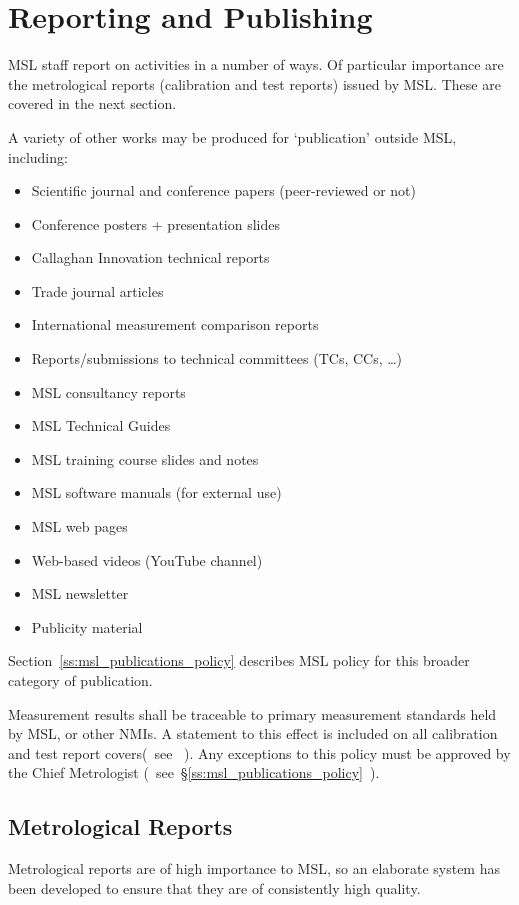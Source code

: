 \section{Reporting and Publishing}
MSL staff report on activities in a number of ways. Of particular importance are the metrological reports (calibration and test reports) issued by MSL. These are covered in the next section. 

A variety of other works may be produced for ‘publication' outside MSL, including:
\begin{itemize}
\item Scientific journal and conference papers (peer-reviewed or not)
\item Conference posters + presentation slides
\item Callaghan Innovation technical reports
\item Trade journal articles
\item International measurement comparison reports
\item Reports/submissions to technical committees (TCs, CCs, …)
\item MSL consultancy reports
\item MSL Technical Guides
\item MSL training course slides and notes
\item MSL software manuals (for external use)
\item MSL web pages
\item Web-based videos (YouTube channel)   
\item MSL newsletter
\item Publicity material
\end{itemize}

Section~\ref{ss:msl_publications_policy} describes MSL policy for this broader category of publication.

Measurement results shall be traceable to primary measurement standards held by MSL, or other NMIs. A statement to this effect is included on all calibration and test report covers(~see  \cite[\S\ref*{GRP-ss:report_covers}]{MSL_Reporting_Guidelines}~). Any exceptions to this policy must be approved by the Chief Metrologist (~see~\S\ref{ss:msl_publications_policy}~).

\subsection{Metrological Reports}
\label{ss:metrological_reports}
Metrological reports are of high importance to MSL, so an elaborate system has been developed to ensure that they are of consistently high quality.


